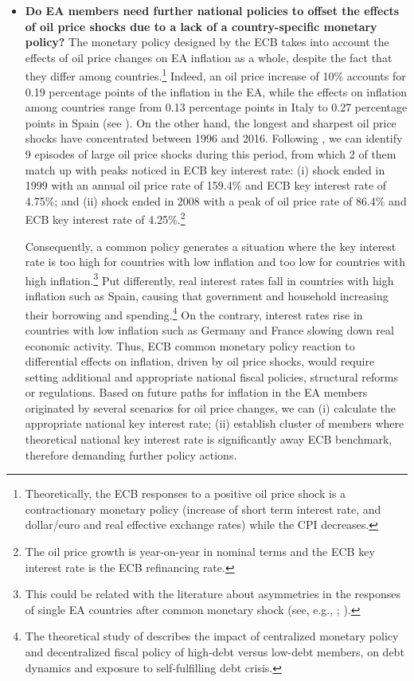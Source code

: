\documentclass{article}\usepackage[]{graphicx}\usepackage[]{color}
\begin{document}
\begin{itemize}
\item \textbf{Do EA members need further national policies to offset the effects of oil price shocks due to a lack of a country-specific monetary policy?} The monetary policy designed by the ECB takes into account the effects of oil price changes on EA inflation as a whole, despite the fact that they differ among countries.\footnote{Theoretically, the ECB responses to a positive oil price shock is a contractionary monetary policy (increase of short term interest rate, and dollar/euro and real effective exchange rates) while the CPI decreases.} Indeed, an oil price increase of 10\% accounts for 0.19 percentage points of the inflation in the EA, while the effects on inflation among countries range from 0.13 percentage points in Italy to 0.27 percentage points in Spain (see \citealp{Castro2016a}). On the other hand, the longest and sharpest oil price shocks have concentrated between 1996 and 2016. Following \cite{BlanchardGali2010}, we can identify 9 episodes of large oil price shocks during this period, from which 2 of them match up with peaks noticed in ECB key interest rate: (i) shock ended in 1999 with an annual oil price rate of 159.4\% and ECB key interest rate of 4.75\%; and (ii) shock ended in 2008 with a peak of oil price rate of 86.4\% and ECB key interest rate of 4.25\%.\footnote{The oil price growth is year-on-year in nominal terms and the ECB key interest rate is the ECB refinancing rate.}

Consequently, a common policy generates a situation where the key interest rate is too high for countries with low inflation and too low for countries with high inflation.\footnote{This could be related with the literature about asymmetries in the responses of single EA countries after common monetary shock (see, e.g., \citealp{Barigozzi2014}; \citealp{Cavallo2015}).} Put differently, real interest rates fall in countries with high inflation such as Spain, causing that government and household increasing their borrowing and spending.\footnote{The theoretical study of \cite{Aguiar2015} describes the impact of centralized monetary policy and decentralized fiscal policy of high-debt versus low-debt members, on debt dynamics and exposure to self-fulfilling debt crisis.} On the contrary, interest rates rise in countries with low inflation such as Germany and France slowing down real economic activity. Thus, ECB common monetary policy reaction to differential effects on inflation, driven by oil price shocks, would require setting additional and appropriate national fiscal policies, structural reforms or regulations. Based on future paths for inflation in the EA members originated by several scenarios for oil price changes, we can (i) calculate the appropriate national key interest rate; (ii) establish cluster of members where theoretical national key interest rate is significantly away ECB benchmark, therefore demanding further policy actions.

\end{itemize}
\end{document}

